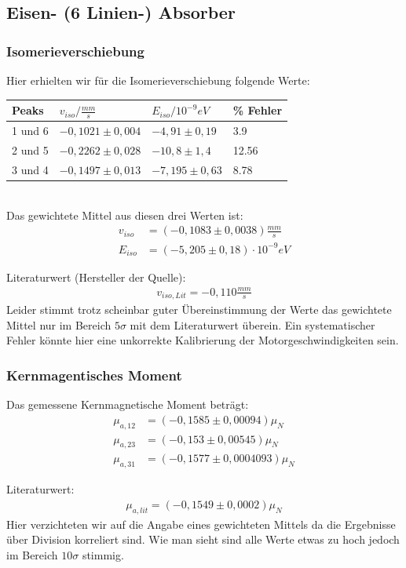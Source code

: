 \documentclass[12pt]{article}
\begin{document}
\subsection*{Eisen- (6 Linien-) Absorber}
\subsubsection*{Isomerieverschiebung}
Hier erhielten wir für die Isomerieverschiebung folgende Werte: \\

\begin{tabular}{|l|lll|}
\hline
Peaks & $v_{iso}/\frac{mm}{s}$ & $E_{iso}/10^{-9}eV$ & \% Fehler\\
\hline
1 und 6& $-0,1021 \pm 0,004$ & $-4,91 \pm 0,19$ & 3.9\\
2 und 5& $-0,2262 \pm 0,028$ & $-10,8 \pm 1,4$ & 12.56\\
3 und 4& $-0,1497 \pm 0,013$ & $-7,195 \pm 0,63$ & 8.78\\
\hline
\end{tabular} \\

Das gewichtete Mittel aus diesen drei Werten ist:
\begin{align*}
  v_{iso} &= ( -0,1083 \pm 0,0038) \frac{mm}{s} \\
 E_{iso} &= ( -5,205 \pm 0,18 ) \cdot 10^{-9} eV
\end{align*}

Literaturwert (Hersteller der Quelle):
\begin{align*}
 v_{iso,Lit} = -0,110 \frac{mm}{s}
\end{align*}
Leider stimmt trotz scheinbar guter Übereinstimmung der Werte das gewichtete Mittel nur im Bereich $5\sigma$ mit dem Literaturwert überein. 
Ein systematischer Fehler könnte hier eine unkorrekte Kalibrierung der Motorgeschwindigkeiten sein.

\subsubsection*{Kernmagentisches Moment}
Das gemessene Kernmagnetische Moment beträgt:
\begin{align}
\mu_{a,12} &=  (-0,1585 \pm 0,00094) \mu_N \\
\mu_{a,23} &=  (-0,153 \pm 0,00545) \mu_N \\
\mu_{a,31} &=  (-0,1577 \pm 0,0004093) \mu_N 
\end{align}

Literaturwert:
\begin{align*}
\mu_{a,lit} = (-0,1549 \pm 0,0002) \mu_N
\end{align*}
Hier verzichteten wir auf die Angabe eines gewichteten Mittels da die Ergebnisse über Division korreliert sind. Wie man sieht sind alle Werte etwas zu hoch
jedoch im Bereich $10\sigma$ stimmig.
\end{document}
